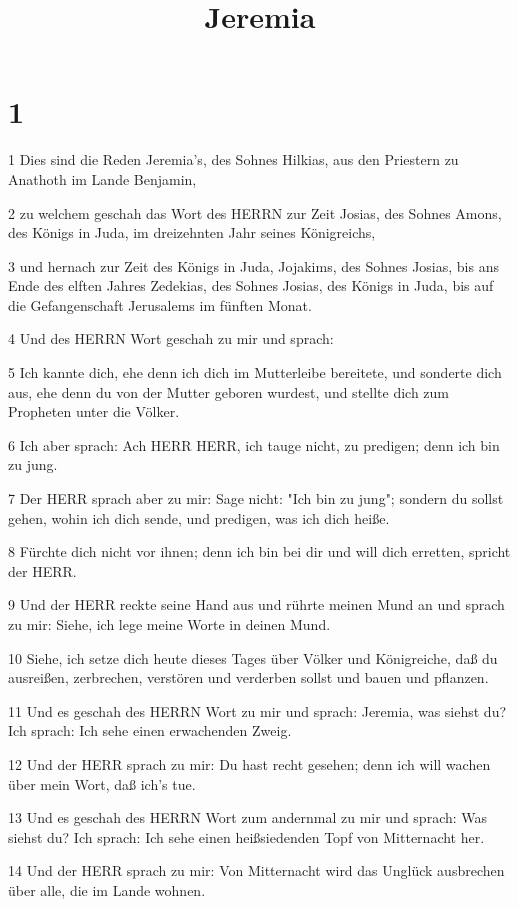 

\title{Jeremia}


\chapter{1}

\par 1 Dies sind die Reden Jeremia's, des Sohnes Hilkias, aus den Priestern zu Anathoth im Lande Benjamin,
\par 2 zu welchem geschah das Wort des HERRN zur Zeit Josias, des Sohnes Amons, des Königs in Juda, im dreizehnten Jahr seines Königreichs,
\par 3 und hernach zur Zeit des Königs in Juda, Jojakims, des Sohnes Josias, bis ans Ende des elften Jahres Zedekias, des Sohnes Josias, des Königs in Juda, bis auf die Gefangenschaft Jerusalems im fünften Monat.
\par 4 Und des HERRN Wort geschah zu mir und sprach:
\par 5 Ich kannte dich, ehe denn ich dich im Mutterleibe bereitete, und sonderte dich aus, ehe denn du von der Mutter geboren wurdest, und stellte dich zum Propheten unter die Völker.
\par 6 Ich aber sprach: Ach HERR HERR, ich tauge nicht, zu predigen; denn ich bin zu jung.
\par 7 Der HERR sprach aber zu mir: Sage nicht: "Ich bin zu jung"; sondern du sollst gehen, wohin ich dich sende, und predigen, was ich dich heiße.
\par 8 Fürchte dich nicht vor ihnen; denn ich bin bei dir und will dich erretten, spricht der HERR.
\par 9 Und der HERR reckte seine Hand aus und rührte meinen Mund an und sprach zu mir: Siehe, ich lege meine Worte in deinen Mund.
\par 10 Siehe, ich setze dich heute dieses Tages über Völker und Königreiche, daß du ausreißen, zerbrechen, verstören und verderben sollst und bauen und pflanzen.
\par 11 Und es geschah des HERRN Wort zu mir und sprach: Jeremia, was siehst du? Ich sprach: Ich sehe einen erwachenden Zweig.
\par 12 Und der HERR sprach zu mir: Du hast recht gesehen; denn ich will wachen über mein Wort, daß ich's tue.
\par 13 Und es geschah des HERRN Wort zum andernmal zu mir und sprach: Was siehst du? Ich sprach: Ich sehe einen heißsiedenden Topf von Mitternacht her.
\par 14 Und der HERR sprach zu mir: Von Mitternacht wird das Unglück ausbrechen über alle, die im Lande wohnen.
